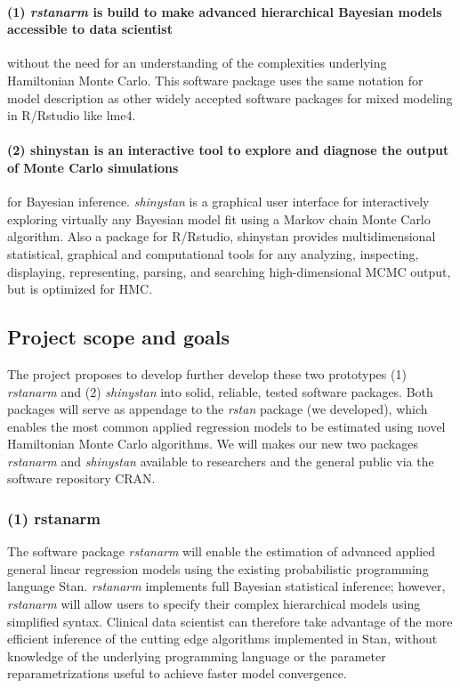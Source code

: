 \documentclass[11pt,notitlepage]{article}
\begin{document}
\paragraph*{(1) \textit{rstanarm} is build to make advanced hierarchical Bayesian models accessible to data scientist} without the need for an understanding of the complexities underlying Hamiltonian Monte Carlo. This software package uses the same notation for model description as other widely accepted software packages for mixed modeling in R/Rstudio like lme4. 
\paragraph*{(2) shinystan is an interactive tool to explore and diagnose the output of Monte Carlo simulations}for Bayesian inference.  \textit{shinystan} is a graphical user interface for interactively exploring virtually any Bayesian model fit using a Markov chain Monte Carlo algorithm. Also a package for R/Rstudio, shinystan  provides multidimensional statistical, graphical and computational tools for any analyzing, inspecting, displaying, representing, parsing, and searching high-dimensional MCMC output, but is optimized for HMC. 

\subsection*{Project scope and goals }
The project proposes to develop further develop these two prototypes (1) \textit{rstanarm} and (2) \textit{shinystan} into solid, reliable, tested software packages. Both packages will serve as appendage to the \textit{rstan} package (we developed), which enables the most common applied regression models to be estimated using novel Hamiltonian Monte Carlo algorithms. We will makes our new two packages \textit{rstanarm} and \textit{shinystan} available to researchers and the general public via the software repository CRAN. 

\subsubsection*{(1) rstanarm}
The software package \textit{rstanarm} will enable the estimation of advanced applied general linear regression models using the existing probabilistic programming language Stan. \textit{rstanarm} implements full Bayesian statistical inference;  however, \textit{rstanarm} will allow users to specify their complex hierarchical models using simplified syntax. Clinical data scientist can therefore take advantage of the  more efficient inference of the cutting edge algorithms implemented in Stan, without knowledge of the underlying programming language or the parameter reparametrizations useful to achieve faster model convergence.
\end{document}
